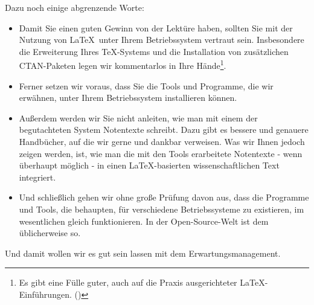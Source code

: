Dazu noch einige abgrenzende Worte:
\begin{itemize}
  \item Damit Sie einen guten Gewinn von der Lektüre haben, sollten Sie mit der
  Nutzung von \LaTeX\ unter Ihrem Betriebssystem vertraut sein.
  Insbesondere die Erweiterung Ihres \TeX-Systems und die Installation von
  zusätzlichen CTAN-Paketen legen wir kommentarlos in Ihre Hände\footnote{Es
  gibt eine Fülle guter, auch auf die Praxis ausgerichteter \LaTeX-Einführungen.
  (\cite[etwa][7ff]{Schlosser2016a})}.
  \item Ferner setzen wir voraus, dass Sie die Tools und Programme, die wir
  erwähnen, unter Ihrem Betriebssystem installieren können.
  \item Außerdem werden wir Sie nicht anleiten, wie man mit einem der
  begutachteten System Notentexte schreibt. Dazu gibt es bessere und genauere
  Handbücher, auf die wir gerne und dankbar verweisen. Was wir Ihnen jedoch
  zeigen werden, ist, wie man die mit den Tools erarbeitete Notentexte - wenn
  überhaupt möglich - in einen \LaTeX-basierten wissenschaftlichen Text
  integriert.
  \item Und schließlich gehen wir ohne große Prüfung davon aus, dass die
  Programme und Tools, die behaupten, für verschiedene Betriebssysteme zu
  existieren, im wesentlichen gleich funktionieren. In der Open-Source-Welt ist
  dem üblicherweise so.
\end{itemize}

Und damit wollen wir es gut sein lassen mit dem Erwartungsmanagement.



%
